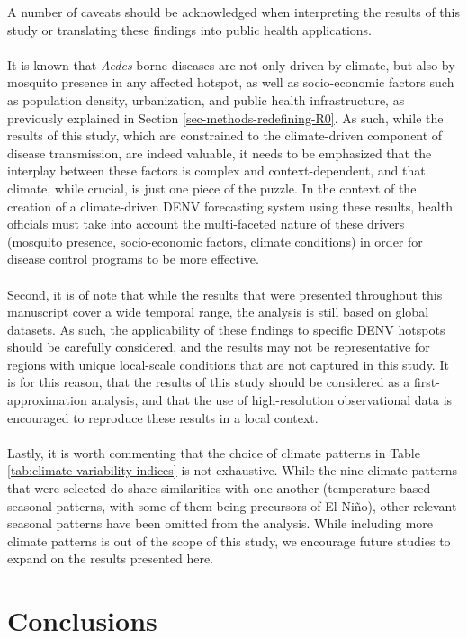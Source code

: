 \documentclass[10pt,twocolumn]{wlscirep}
\begin{document}
A number of caveats should be acknowledged when interpreting the results of this study or translating these findings into public health applications.
\\
\\
It is known that \textit{Aedes}-borne diseases are not only driven by climate, but also by mosquito presence in any affected hotspot, as well as socio-economic factors such as population density, urbanization, and public health infrastructure, as previously explained in Section \ref{sec-methods-redefining-R0}. As such, while the results of this study, which are constrained to the climate-driven component of disease transmission, are indeed valuable, it needs to be emphasized that the interplay between these factors is complex and context-dependent, and that climate, while crucial, is just one piece of the puzzle. In the context of the creation of a climate-driven DENV forecasting system using these results, health officials must take into account the multi-faceted nature of these drivers (mosquito presence, socio-economic factors, climate conditions) in order for disease control programs to be more effective.
\\
\\
Second, it is of note that while the results that were presented throughout this manuscript cover a wide temporal range, the analysis is still based on global datasets. As such, the applicability of these findings to specific DENV hotspots should be carefully considered, and the results may not be representative for regions with unique local-scale conditions that are not captured in this study. It is for this reason, that the results of this study should be considered as a first-approximation analysis, and that the use of high-resolution observational data is encouraged to reproduce these results in a local context.
\\
\\
Lastly, it is worth commenting that the choice of climate patterns in Table \ref{tab:climate-variability-indices} is not exhaustive. While the nine climate patterns that were selected do share similarities with one another (temperature-based seasonal patterns, with some of them being precursors of El Niño), other relevant seasonal patterns have been omitted from the analysis. While including more climate patterns is out of the scope of this study, we encourage future studies to expand on the results presented here.

\section{Conclusions} \label{sec-conclusions}
\end{document}
